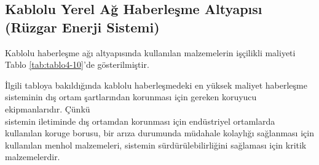 \subsection{Kablolu Yerel Ağ Haberleşme Altyapısı (Rüzgar Enerji Sistemi)}


Kablolu haberleşme ağı altyapısında kullanılan malzemelerin işçilikli maliyeti Tablo \ref{tab:tablo4-10}’de gösterilmiştir.

İlgili tabloya bakıldığında kablolu haberleşmedeki en yüksek maliyet haberleşme sisteminin dış ortam şartlarından korunması için gereken koruyucu ekipmanlarıdır. Çünkü\\ sistemin iletiminde dış ortamdan korunması için endüstriyel ortamlarda kullanılan koruge borusu, bir arıza durumunda müdahale kolaylığı sağlanması için kullanılan menhol malzemeleri, sistemin sürdürülebilirliğini sağlaması için kritik malzemelerdir.


